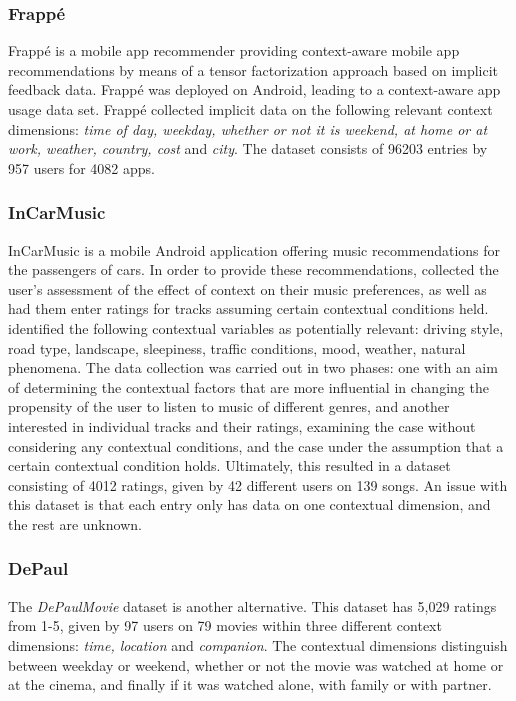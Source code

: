 \subsubsection{Frappé}
Frappé is a mobile app recommender providing context-aware mobile app recommendations by means of a tensor factorization approach based on implicit feedback data\cite{baltrunas2015frappe}.
Frappé was deployed on Android, leading to a context-aware app usage data set.
Frappé collected implicit data on the following relevant context dimensions: \textit{time of day, weekday, whether or not it is weekend, at home or at work, weather, country, cost} and \textit{city}. 
The dataset consists of 96203 entries by 957 users for 4082 apps.

\subsubsection{InCarMusic}
InCarMusic is a mobile Android application offering music recommendations for the passengers of cars.
In order to provide these recommendations, \cite{InCarMusic2011} collected the user's assessment of the effect of context on their music preferences, as well as had them enter ratings for tracks assuming certain contextual conditions held.
\cite{InCarMusic2011} identified the following contextual variables as potentially relevant: driving style, road type, landscape, sleepiness, traffic conditions, mood, weather, natural phenomena.
The data collection was carried out in two phases: one with an aim of determining the contextual factors that are more influential in changing the propensity of the user to listen to music of different genres, and another interested in individual tracks and their ratings, examining the case without considering any contextual conditions, and the case under the assumption that a certain contextual condition holds.
Ultimately, this resulted in a dataset consisting of 4012 ratings, given by 42 different users on 139 songs.
An issue with this dataset is that each entry only has data on one contextual dimension, and the rest are unknown.

\subsubsection{DePaul}
The \textit{DePaulMovie} dataset is another alternative.
This dataset has 5,029 ratings from 1-5, given by 97 users on 79 movies within three different context dimensions: \textit{time, location} and \textit{companion}\cite{DePaulData}.
The contextual dimensions distinguish between weekday or weekend, whether or not the movie was watched at home or at the cinema, and finally if it was watched alone, with family or with partner.


